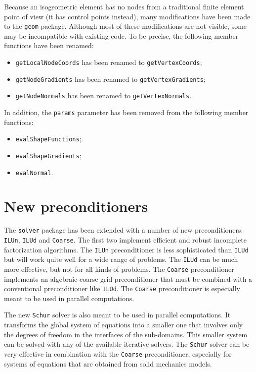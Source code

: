 \documentclass[a4paper]{article}
\newcommand{\Code}[1]{\texttt{#1}}
\begin{document}
Because an isogeometric element has no nodes from a traditional finite
element point of view (it has control points instead), many modifications
have been made to the \Code{geom} package. Although most of these
modifications are not visible, some may be incompatible with existing
code. To be precise, the following member functions have been renamed:
\begin{itemize}

  \item \Code{getLocalNodeCoords} has been renamed to
    \Code{getVertexCoords};

  \item \Code{getNodeGradients} has been renamed to
    \Code{getVertexGradients};

  \item \Code{getNodeNormals} has been renamed to
    \Code{getVertexNormals}.

\end{itemize}
In addition, the \Code{params} parameter has been removed from the
following member functions:
\begin{itemize}
  \item \Code{evalShapeFunctions};
  \item \Code{evalShapeGradients};
  \item \Code{evalNormal}.
\end{itemize}


\section{New preconditioners}

The \Code{solver} package has been extended with a number of new
preconditioners: \Code{ILUn}, \Code{ILUd} and \Code{Coarse}. The first
two implement efficient and robust incomplete factorization algorithms.
The \Code{ILUn} preconditioner is less sophisticated than \Code{ILUd} but
will work quite well for a wide range of problems. The \Code{ILUd} can be
much more effective, but not for all kinds of problems. The
\Code{Coarse} preconditioner implements an algebraic coarse grid
preconditioner that must be combined with a conventional preconditioner
like \Code{ILUd}. The \Code{Coarse} preconditioner is especially meant to
be used in parallel computations.

The new \Code{Schur} solver is also meant to be used in parallel
computations. It transforms the global system of equations into a smaller
one that involves only the degrees of freedom in the interfaces of the
sub-domains. This smaller system can be solved with any of the available
iterative solvers. The \Code{Schur} solver can be very effective in
combination with the \Code{Coarse} preconditioner, especially for systems
of equations that are obtained from solid mechanics models.
\end{document}
